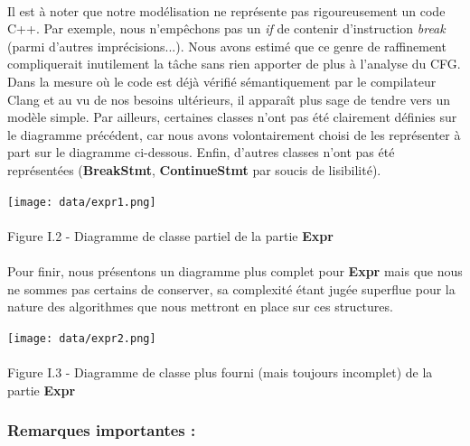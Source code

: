 \documentclass{report}
\begin{document}
\paragraph{}
\hspace{4mm}\textnormal{Il est \`{a} noter que notre mod\'{e}lisation ne repr\'{e}sente pas rigoureusement un code C++.  Par exemple, nous n'emp\^{e}chons pas un \textit{if} de contenir d'instruction \textit{break} (parmi d'autres impr\'{e}cisions...).
Nous avons estim\'{e} que ce genre de raffinement compliquerait inutilement la t\^{a}che
sans rien apporter de plus \`{a} l'analyse du CFG. Dans la mesure o\`{u} le code est d\'{e}j\`{a} v\'{e}rifi\'{e} s\'{e}mantiquement par le compilateur Clang et au vu de nos besoins ult\'{e}rieurs,
il appara\^{i}t plus sage de tendre vers un mod\`{e}le simple. Par ailleurs, certaines classes n'ont pas \'{e}t\'{e} clairement d\'{e}finies sur le diagramme pr\'{e}c\'{e}dent, car nous avons volontairement
choisi de les repr\'{e}senter \`{a} part sur le diagramme ci-dessous. Enfin, d'autres classes n'ont pas \'{e}t\'{e} repr\'{e}sent\'{e}es (\textbf{BreakStmt}, \textbf{ContinueStmt} par soucis de lisibilit\'{e}).}

\begin{center}
\texttt{[image: data/expr1.png]}
~\\~\\Figure I.2 - Diagramme de classe partiel de la partie \textbf{Expr}
\end{center}

\paragraph{}
\hspace{4mm}\textnormal{Pour finir, nous pr\'{e}sentons un diagramme plus complet pour \textbf{Expr} mais que nous ne sommes pas certains de conserver, sa complexit\'{e} \'{e}tant jug\'{e}e 
superflue pour la nature des algorithmes que nous mettront en place sur ces structures.}

\begin{center}
\texttt{[image: data/expr2.png]}
~\\~\\Figure I.3 - Diagramme de classe plus fourni (mais toujours incomplet) de la partie \textbf{Expr}
\end{center}

\subsubsection{Remarques importantes :}
\end{document}
